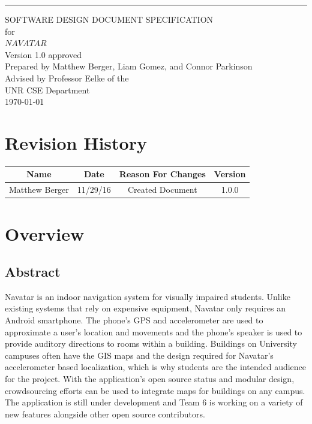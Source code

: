 \documentclass{scrreprt}
\date{}
\def\myversion{1.0 }
\begin{document}
\begin{flushright}
    \rule{16cm}{5pt}\vskip1cm
    \begin{bfseries}
        \Huge{SOFTWARE DESIGN DOCUMENT SPECIFICATION}\\
        \vspace{1.6cm}
        for\\
        \vspace{1.6cm}
        $NAVATAR$\\
        \vspace{1.6cm}
        \LARGE{Version \myversion approved}\\
        \vspace{1.6cm}
        Prepared by Matthew Berger, Liam Gomez, and Connor Parkinson\\ 
        \vspace{1.6cm}
        Advised by Professor Eelke of the\\UNR CSE Department\\
        \vspace{1.6cm}
        \today\\
    \end{bfseries}
\end{flushright}

\tableofcontents

\chapter*{Revision History}

\begin{center}
    \begin{tabular}{|c|c|c|c|}
        \hline
	    Name & Date & Reason For Changes & Version\\
        \hline
	    Matthew Berger & 11/29/16 & Created Document & 1.0.0\\
        \hline
    \end{tabular}
\end{center}

\chapter{Overview}

	\section{Abstract}
Navatar is an indoor navigation system for visually impaired students. Unlike existing systems that rely on expensive equipment, Navatar only requires an Android smartphone. The phone’s GPS and accelerometer are used to approximate a user's location and movements and the phone’s speaker is used to provide auditory directions to rooms within a building. Buildings on University campuses often have the GIS maps and the design required for Navatar’s accelerometer based localization, which is why students are the intended audience for the project. With the application’s open source status and modular design, crowdsourcing efforts can be used to integrate maps for buildings on any campus. The application is still under development and Team 6 is working on a variety of new features alongside other open source contributors.
\end{document}
